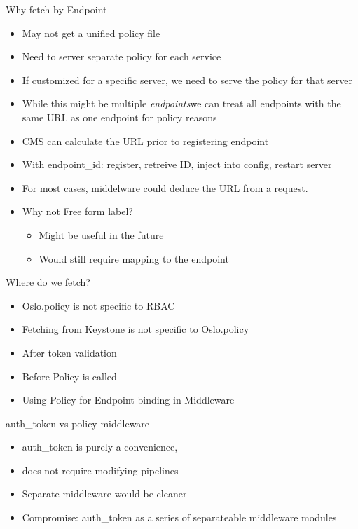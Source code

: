 \documentclass{beamer}
\begin{document}
\begin{frame}{Why fetch by Endpoint}
  \begin{itemize}
  \item May not get a unified policy file
  \item Need to server separate policy for each service
  \item If customized for a specific server, we need to serve the policy for that server
  \item While this might be multiple \textit{endpoints}we can treat all endpoints with the same URL as one endpoint for policy reasons
  \item CMS can calculate the URL prior to registering endpoint
  \item With endpoint\_id: register, retreive ID, inject into config, restart server
  \item For most cases, middelware could deduce the URL from a request.
  \item Why not Free form label?
    \begin{itemize}
    \item Might be useful in the future
    \item Would still require mapping to the endpoint 
    \end{itemize}
  \end{itemize}
\end{frame}


\begin{frame}{Where do we fetch?}
  \begin{itemize}
  \item Oslo.policy is not specific to RBAC
  \item Fetching from Keystone is not specific to Oslo.policy
  \item After token validation
  \item Before Policy is called
  \item Using Policy for Endpoint binding in Middleware
  \end{itemize}
\end{frame}


\begin{frame}{auth\_token vs policy middleware}
  \begin{itemize}
  \item auth\_token is purely a convenience, 
  \item does not require modifying pipelines
  \item Separate middleware would be cleaner
  \item Compromise: auth\_token as a series of separateable middleware modules
  \end{itemize}
\end{frame}
\end{document}
